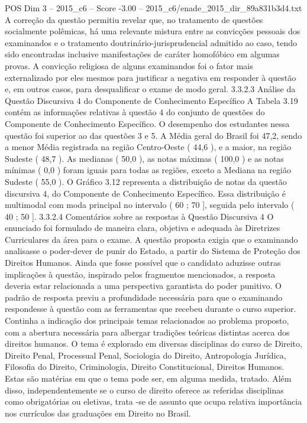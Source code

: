 \begin{textsample}{POS Dim 3 – 2015\_c6 – Score -3.00 – 2015\_c6/enade\_2015\_dir\_89a831b3d4.txt}
A correção da questão permitiu revelar que, no tratamento de questões socialmente polêmicas, há uma relevante mistura entre as convicções pessoais dos examinandos e o tratamento doutrinário-jurisprudencial admitido ao caso, tendo sido encontradas inclusive manifestações de caráter homofóbico em algumas provas.
A convicção religiosa de alguns examinandos foi o fator mais externalizado por eles mesmos para justificar a negativa em responder à questão e, em outros casos, para desqualificar o exame de modo geral. 3.3.2.3 Análise da Questão Discursiva 4 do Componente de Conhecimento Específico A Tabela 3.19 contém as informações relativas à questão 4 do conjunto de questões do Componente de Conhecimento Específico.
O desempenho dos estudantes nessa questão foi superior ao das questões 3 e 5.
A Média geral do Brasil foi 47,2, sendo a menor Média registrada na região Centro-Oeste ( 44,6 ), e a maior, na região Sudeste ( 48,7 ).
As medianas ( 50,0 ), as notas máximas ( 100,0 ) e as notas mínimas ( 0,0 ) foram iguais para todas as regiões, exceto a Mediana na região Sudeste ( 55,0 ).
O Gráfico 3.12 representa a distribuição de notas da questão discursiva 4, do Componente de Conhecimento Específico.
Essa distribuição é multimodal com moda principal no intervalo ( 60 ; 70 ], seguida pelo intervalo ( 40 ; 50 ]. 3.3.2.4 Comentários sobre as respostas à Questão Discursiva 4 O enunciado foi formulado de maneira clara, objetiva e adequada às Diretrizes Curriculares da área para o exame.
A questão proposta exigia que o examinando analisasse o poder-dever de punir do Estado, a partir do Sistema de Proteção dos Direitos Humanos.
Ainda que fosse possível que o candidato aduzisse outras implicações à questão, inspirado pelos fragmentos mencionados, a resposta deveria estar relacionada a uma perspectiva garantista do poder punitivo.
O padrão de resposta previu a profundidade necessária para que o examinando respondesse à questão com as ferramentas que recebeu durante o curso superior.
Continha a indicação dos principais temas relacionados ao problema proposto, com a abertura necessária para albergar tradições teóricas distintas acerca dos direitos humanos.
O tema é explorado em diversas disciplinas do curso de Direito, Direito Penal, Processual Penal, Sociologia do Direito, Antropologia Jurídica, Filosofia do Direito, Criminologia, Direito Constitucional, Direitos Humanos.
Estas são matérias em que o tema pode ser, em alguma medida, tratado.
Além disso, independentemente se o curso de direito oferece as referidas disciplinas como obrigatórias ou eletivas, trata -se de assunto que ocupa relativa importância nos currículos das graduações em Direito no Brasil.

\end{textsample}
